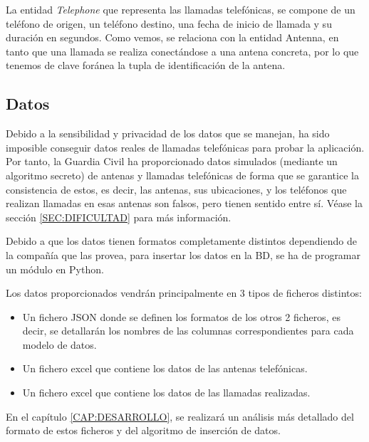     La entidad \textit{Telephone} que representa las llamadas telefónicas, se compone de un teléfono de origen, un teléfono destino, una fecha de inicio de llamada y su duración en segundos. Como vemos, se relaciona con la entidad Antenna, en tanto que una llamada se realiza conectándose a una antena concreta, por lo que tenemos de clave foránea la tupla de identificación de la antena.
       
       
  \subsection{Datos}
    Debido a la sensibilidad y privacidad de los datos que se manejan, ha sido imposible conseguir datos reales de llamadas telefónicas para probar la aplicación. Por tanto, la Guardia Civil ha proporcionado datos simulados (mediante un algoritmo secreto) de antenas y llamadas telefónicas de forma que se garantice la consistencia de estos, es decir, las antenas, sus ubicaciones, y los teléfonos que realizan llamadas en esas antenas son falsos, pero tienen sentido entre sí. Véase la sección \ref{SEC:DIFICULTAD} para más información.

    Debido a que los datos tienen formatos completamente distintos dependiendo de la compañía que las provea, para insertar los datos en la BD, se ha de programar un módulo en Python.
    
    Los datos proporcionados vendrán principalmente en 3 tipos de ficheros distintos:
    \begin{itemize}
      \item Un fichero JSON donde se definen los formatos de los otros 2 ficheros, es decir, se detallarán los nombres de las columnas correspondientes para cada modelo de datos.
      \item Un fichero excel que contiene los datos de las antenas telefónicas.
      \item Un fichero excel que contiene los datos de las llamadas realizadas.
    \end{itemize}
  
    En el capítulo \ref{CAP:DESARROLLO}, se realizará un análisis más detallado del formato de estos ficheros y del algoritmo de inserción de datos.